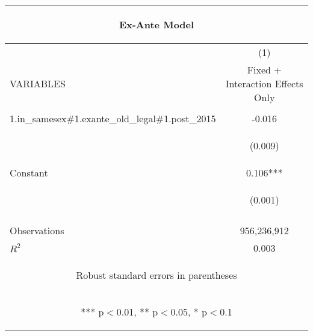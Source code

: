 \documentclass[]{article}
\begin{document}
\begin{center}
\begin{tabular}{lc}
\multicolumn{2}{c}{\begin{large}Ex-Ante Model\end{large}} \\ \hline
 & (1) \\
VARIABLES & Fixed + Interaction Effects Only \\ \hline
\vspace{4pt} & \begin{footnotesize}\end{footnotesize} \\
1.in\_samesex\#1.exante\_old\_legal\#1.post\_2015 & -0.016 \\
\vspace{4pt} & \begin{footnotesize}(0.009)\end{footnotesize} \\
Constant & 0.106*** \\
 & \begin{footnotesize}(0.001)\end{footnotesize} \\
\vspace{4pt} & \begin{footnotesize}\end{footnotesize} \\
Observations & 956,236,912 \\
 $R^2$ & 0.003 \\ \hline
\multicolumn{2}{c}{\begin{footnotesize} Robust standard errors in parentheses\end{footnotesize}} \\
\multicolumn{2}{c}{\begin{footnotesize} *** p$<$0.01, ** p$<$0.05, * p$<$0.1\end{footnotesize}} \\
\end{tabular}
\end{center}
\end{document}
